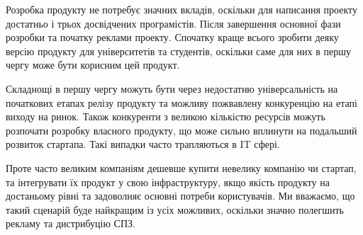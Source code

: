 Розробка продукту не потребує значних вкладів, оскільки для написання проекту достатньо і трьох досвідчених програмістів. Після завершення основної фази розробки та початку реклами проекту. Спочатку краще всього зробити деяку версію продукту для університетів та студентів, оскільки саме для них в першу чергу може бути корисним цей продукт.

Складнощі в першу чергу можуть бути через недостатню універсальність на початкових етапах релізу продукту та можливу пожвавлену конкуренцію на етапі виходу на ринок. Також конкуренти з великою кількістю ресурсів можуть розпочати розробку власного продукту, що може сильно вплинути на подальший розвиток стартапа. Такі випадки часто трапляються в IT сфері.

Проте часто великим компаніям дешевше купити невелику компанію чи стартап, та інтегрувати їх продукт у свою інфраструктуру, якщо якість продукту на достаньому рівні та задоволняє основні потреби користувачів. Ми вважаємо, що такий сценарій буде найкращим із усіх можливих, оскільки значно полегшить рекламу та дистрибуцію СПЗ.
